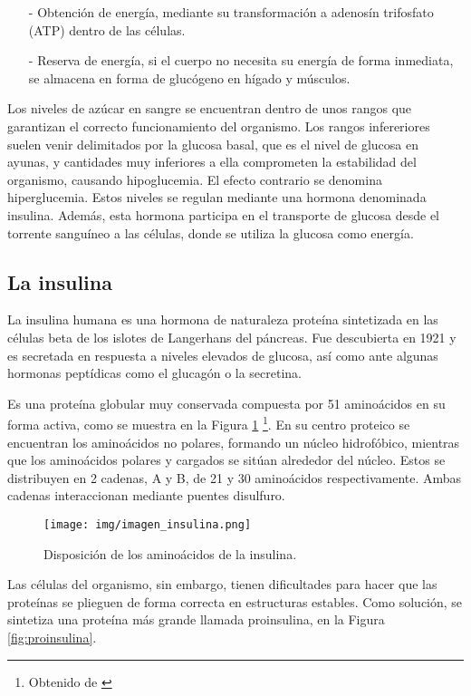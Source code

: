 \begin{enumerate}
    \item[-] Obtención de energía, mediante su transformación a adenosín trifosfato (ATP) dentro de las células.
    \item[-] Reserva de energía, si el cuerpo no necesita su energía de forma inmediata, se almacena en forma de glucógeno en hígado y músculos.
\end{enumerate}

Los niveles de azúcar en sangre se encuentran dentro de unos rangos que garantizan el correcto funcionamiento del organismo. Los rangos infereriores suelen venir delimitados por la glucosa basal, que es el nivel de glucosa en ayunas, y cantidades muy inferiores a ella comprometen la estabilidad del organismo, causando hipoglucemia. El efecto contrario se denomina hiperglucemia. Estos niveles se regulan mediante una hormona denominada insulina. Además, esta hormona participa en el transporte de glucosa desde el torrente sanguíneo a las células, donde se utiliza la glucosa como energía.


\subsection{La insulina}

La insulina humana es una hormona de naturaleza proteína sintetizada en las células beta de los islotes de Langerhans del páncreas. Fue descubierta en 1921 y es secretada en respuesta a niveles elevados de glucosa, así como ante algunas hormonas peptídicas como el glucagón o la secretina.

Es una proteína globular muy conservada compuesta por 51 aminoácidos en su forma activa, como se muestra en la Figura \ref{fig:insulina_quimica} \footnote{Obtenido de \cite{insulina_website}}. En su centro proteico se encuentran los aminoácidos no polares, formando un núcleo hidrofóbico, mientras que los aminoácidos polares y cargados se sitúan alrededor del núcleo. Estos se distribuyen en 2 cadenas, A y B, de 21 y 30 aminoácidos respectivamente. Ambas cadenas interaccionan mediante puentes disulfuro.

\begin{figure}[h]
    \centering
    \texttt{[image: img/imagen\_insulina.png]}
    \caption{Disposición de los aminoácidos de la insulina.}
    \label{fig:insulina_quimica}
\end{figure}

Las células del organismo, sin embargo, tienen dificultades para hacer que las proteínas se plieguen de forma correcta en estructuras estables. Como solución, se sintetiza una proteína más grande llamada proinsulina, en la Figura \ref{fig:proinsulina}.

